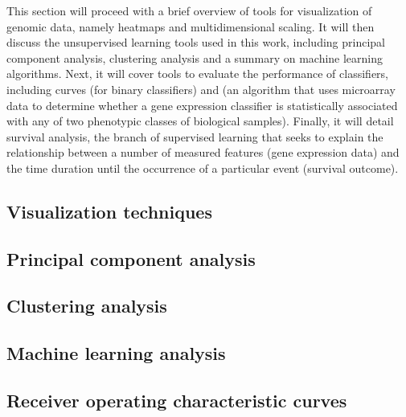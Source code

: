 
\medskip

This section will proceed with a brief overview of tools for visualization of
genomic data, namely heatmaps and multidimensional scaling.  It will then
discuss the unsupervised learning tools used in this work, including principal
component analysis, clustering analysis and a summary on machine learning
algorithms.  Next, it will cover tools to evaluate the performance of
classifiers, including  curves (for binary classifiers) and
 (an algorithm that uses microarray data to determine whether a
gene expression classifier is statistically associated with any of two
phenotypic classes of biological samples).  Finally, it will detail survival
analysis, the branch of supervised learning that seeks to explain the
relationship between a number of measured features (gene expression data) and
the time duration until the occurrence of a particular event (survival outcome).

\subsection{Visualization techniques}
\label{sec:methods-visualization}

\subsection{Principal component analysis}
\label{sec:methods-pc}

\subsection{Clustering analysis}
\label{sec:methods-clustering}

\subsection{Machine learning analysis}
\label{sec:methods-machine-learning}

\subsection{Receiver operating characteristic curves}
\label{sec:methods-roc}


